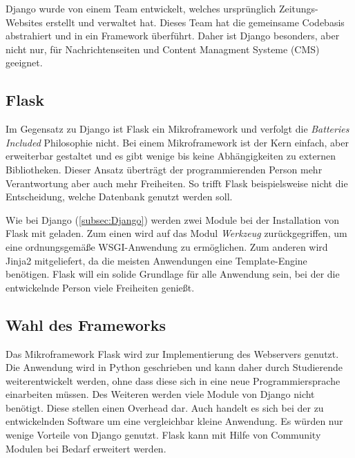 Django wurde von einem Team entwickelt, welches ursprünglich Zeitungs-Websites erstellt und verwaltet hat. Dieses Team hat die gemeinsame Codebasis abstrahiert und in ein Framework überführt. Daher ist Django besonders, aber nicht nur, für Nachrichtenseiten und Content Managment Systeme (CMS) geeignet. \cite{mdncontributorsDjangoIntroduction2019}

\subsection{Flask}
Im Gegensatz zu Django ist Flask ein Mikroframework und verfolgt die \textit{Batteries Included} Philosophie nicht. Bei einem Mikroframework ist der Kern einfach, aber erweiterbar gestaltet und es gibt wenige bis keine Abhängigkeiten zu externen Bibliotheken. Dieser Ansatz überträgt der programmierenden Person mehr Verantwortung aber auch mehr Freiheiten. So trifft Flask beispielsweise nicht die Entscheidung, welche Datenbank genutzt werden soll. \cite{palletsForewordFlaskDocumentation2010} 

Wie bei Django (\autoref{subsec:Django}) werden zwei Module bei der Installation von Flask mit geladen. Zum einen wird auf das Modul \textit{Werkzeug} zurückgegriffen, um eine ordnungsgemäße WSGI-Anwendung zu ermöglichen. Zum anderen wird Jinja2 mitgeliefert, da die meisten Anwendungen eine Template-Engine benötigen.
Flask will ein solide Grundlage für alle Anwendung sein, bei der die entwickelnde Person viele Freiheiten genießt. \cite{palletsDesignDecisionsFlask2010}

\subsection{Wahl des Frameworks}

Das Mikroframework Flask wird zur Implementierung des Webservers genutzt. Die Anwendung wird in Python geschrieben und kann daher durch Studierende weiterentwickelt werden, ohne dass diese sich in eine neue Programmiersprache einarbeiten müssen. Des Weiteren werden viele Module von Django nicht benötigt. Diese stellen einen Overhead dar. Auch handelt es sich bei der zu entwickelnden Software um eine vergleichbar kleine Anwendung. Es würden nur wenige Vorteile von Django genutzt. Flask kann mit Hilfe von Community Modulen bei Bedarf erweitert werden.